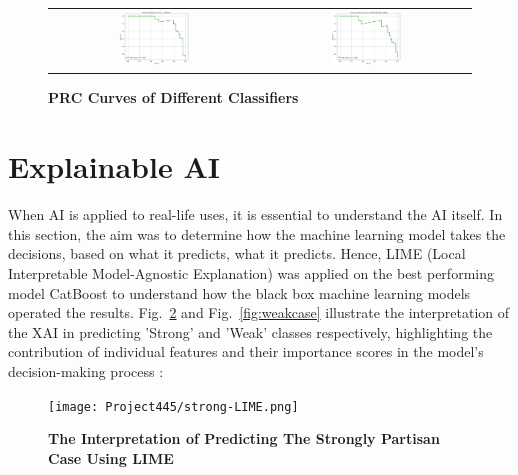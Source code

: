 \documentclass[pt]{article}  %
\begin{document}
\begin{figure}[H]
\begin{center}
\vspace{5pt} %

\begin{tabular}{c c} %
    \includegraphics[width=0.35\textwidth]{prc-curve/cb.png} &
    \includegraphics[width=0.35\textwidth]{prc-curve/ann.png} \\
\end{tabular}

\end{center}
    \caption{\textbf{PRC Curves of Different Classifiers}}
    \label{fig:prc-figure} 
\end{figure}

\section{Explainable AI }When AI is applied to real-life uses, it is essential to understand the AI itself. In this section, the aim was to determine how the machine learning model takes the decisions, based on what it predicts, what it predicts. Hence, LIME (Local Interpretable Model-Agnostic Explanation) was applied on the best performing model CatBoost to understand how the black box machine learning models operated the results\cite{ref14}. Fig.~\ref{fig:strongcase} and Fig.~\ref{fig:weakcase} illustrate the interpretation of the XAI in predicting 'Strong' and 'Weak' classes respectively, highlighting the contribution of individual features and their importance scores in the model’s decision-making process : \vspace{0.5cm}

\begin{figure}[H]
    \centering
    \texttt{[image: Project445/strong-LIME.png]} %
    \caption{\textbf{\small The Interpretation of Predicting The Strongly Partisan Case Using LIME}}
    \label{fig:strongcase}
\end{figure}
\end{document}
